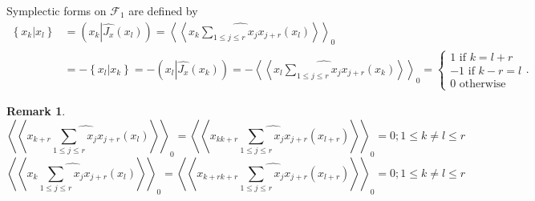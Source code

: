 \documentclass[aps,preprint]{revtex4}
\newtheorem{remark}[theorem]{Remark}
\begin{document}
Symplectic forms on $\mathcal{F}_{1}$ are defined by 
\begin{align}
\left\{ \left. x_{k}\right\vert x_{l}\right\} & =\left( x_{k}\left\vert 
\widehat{J_{x}}\left( \overset{}{x_{l}}\right) \right. \right) =\left\langle
\left\langle x_{k}\widehat{\sum_{1\leq j\leq r}x_{j}x_{j+r}}\left( \overset{}%
{x_{l}}\right) \right\rangle \right\rangle _{0} \\
& =-\left\{ \left. x_{l}\right\vert x_{k}\right\} =-\left( x_{l}\left\vert 
\widehat{J_{x}}\left( \overset{}{x_{k}}\right) \right. \right)
=-\left\langle \left\langle x_{l}\widehat{\sum_{1\leq j\leq r}x_{j}x_{j+r}}%
\left( \overset{}{x_{k}}\right) \right\rangle \right\rangle _{0}=\left\{ 
\begin{array}{c}
1\text{ if }k=l+r \\ 
-1\text{ if }k-r=l \\ 
0\text{ otherwise}%
\end{array}%
\right. .
\end{align}

\begin{remark}
\begin{equation}
\left\langle \left\langle x_{k+r}\widehat{\sum_{1\leq j\leq r}x_{j}x_{j+r}}%
\left( x_{l}\right) \right\rangle \right\rangle _{0}=\left\langle
\left\langle x_{kk+r}\widehat{\sum_{1\leq j\leq r}x_{j}x_{j+r}}\left(
x_{l+r}\right) \right\rangle \right\rangle _{0}=0;1\leq k\neq l\leq r
\end{equation}%
\begin{equation}
\left\langle \left\langle x_{k}\widehat{\sum_{1\leq j\leq r}x_{j}x_{j+r}}%
\left( x_{l}\right) \right\rangle \right\rangle _{0}=\left\langle
\left\langle x_{k+rk+r}\widehat{\sum_{1\leq j\leq r}x_{j}x_{j+r}}\left(
x_{l+r}\right) \right\rangle \right\rangle _{0}=0;1\leq k\neq l\leq r
\end{equation}
\end{remark}
\end{document}
